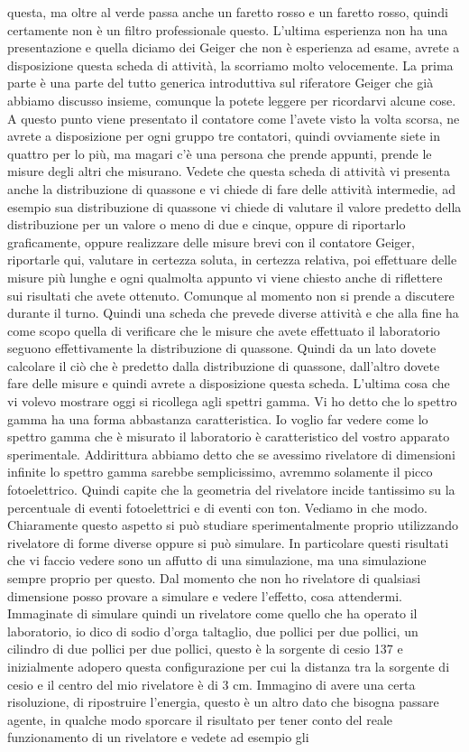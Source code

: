 questa, ma oltre al verde passa anche un faretto rosso e un faretto rosso, quindi certamente non è un filtro professionale questo. L'ultima esperienza non ha una presentazione e quella diciamo dei Geiger che non è esperienza ad esame, avrete a disposizione questa scheda di attività, la scorriamo molto velocemente. La prima parte è una parte del tutto generica introduttiva sul riferatore Geiger che già abbiamo discusso insieme, comunque la potete leggere per ricordarvi alcune cose. A questo punto viene presentato il contatore come l'avete visto la volta scorsa, ne avrete a disposizione per ogni gruppo tre contatori, quindi ovviamente siete in quattro per lo più, ma magari c'è una persona che prende appunti, prende le misure degli altri che misurano. Vedete che questa scheda di attività vi presenta anche la distribuzione di quassone e vi chiede di fare delle attività intermedie, ad esempio sua distribuzione di quassone vi chiede di valutare il valore predetto della distribuzione per un valore o meno di due e cinque, oppure di riportarlo graficamente, oppure realizzare delle misure brevi con il contatore Geiger, riportarle qui, valutare in certezza soluta, in certezza relativa, poi effettuare delle misure più lunghe e ogni qualmolta appunto vi viene chiesto anche di riflettere sui risultati che avete ottenuto. Comunque al momento non si prende a discutere durante il turno. Quindi una scheda che prevede diverse attività e che alla fine ha come scopo quella di verificare che le misure che avete effettuato il laboratorio seguono effettivamente la distribuzione di quassone. Quindi da un lato dovete calcolare il ciò che è predetto dalla distribuzione di quassone, dall'altro dovete fare delle misure e quindi avrete a disposizione questa scheda. L'ultima cosa che vi volevo mostrare oggi si ricollega agli spettri gamma. Vi ho detto che lo spettro gamma ha una forma abbastanza caratteristica. Io voglio far vedere come lo spettro gamma che è misurato il laboratorio è caratteristico del vostro apparato sperimentale. Addirittura abbiamo detto che se avessimo rivelatore di dimensioni infinite lo spettro gamma sarebbe semplicissimo, avremmo solamente il picco fotoelettrico. Quindi capite che la geometria del rivelatore incide tantissimo su la percentuale di eventi fotoelettrici e di eventi con ton. Vediamo in che modo. Chiaramente questo aspetto si può studiare sperimentalmente proprio utilizzando rivelatore di forme diverse oppure si può simulare. In particolare questi risultati che vi faccio vedere sono un affutto di una simulazione, ma una simulazione sempre proprio per questo. Dal momento che non ho rivelatore di qualsiasi dimensione posso provare a simulare e vedere l'effetto, cosa attendermi. Immaginate di simulare quindi un rivelatore come quello che ha operato il laboratorio, io dico di sodio d'orga taltaglio, due pollici per due pollici, un cilindro di due pollici per due pollici, questo è la sorgente di cesio 137 e inizialmente adopero questa configurazione per cui la distanza tra la sorgente di cesio e il centro del mio rivelatore è di 3 cm. Immagino di avere una certa risoluzione, di ripostruire l'energia, questo è un altro dato che bisogna passare agente, in qualche modo sporcare il risultato per tener conto del reale funzionamento di un rivelatore e vedete ad esempio gli 